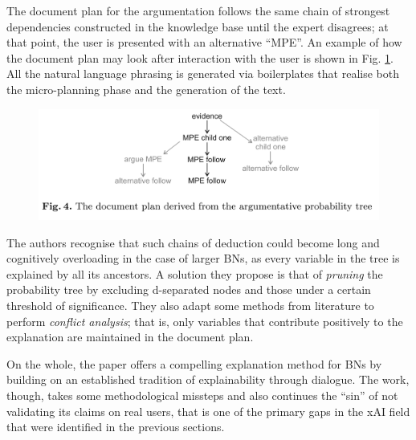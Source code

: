 The document plan for the argumentation follows the same chain of strongest dependencies constructed in the knowledge base until the expert disagrees; at that point, the user is presented with an alternative \enquote{MPE}.
An example of how the document plan may look after interaction with the user is shown in Fig. \ref{fig:butz-tree}.
All the natural language phrasing is generated via boilerplates that realise both the micro-planning phase and the generation of the text.

\begin{figure}[htbp]
\centerline{\includegraphics[width=\columnwidth]{literature-review/images/butz-tree}}
\caption{\cite{Butz2018}}
\label{fig:butz-tree}
\end{figure}

The authors recognise that such chains of deduction could become long and cognitively overloading in the case of larger BNs, as every variable in the tree is explained by all its ancestors.
A solution they propose is that of \textit{pruning} the probability tree by excluding d-separated nodes and those under a certain threshold of significance.
They also adapt some methods from literature to perform \textit{conflict analysis}; that is, only variables that contribute positively to the explanation are maintained in the document plan.

On the whole, the paper offers a compelling explanation method for BNs by building on an established tradition of explainability through dialogue.
The work, though, takes some methodological missteps and also continues the \enquote{sin} of not validating its claims on real users, that is one of the primary gaps in the xAI field that were identified in the previous sections.
